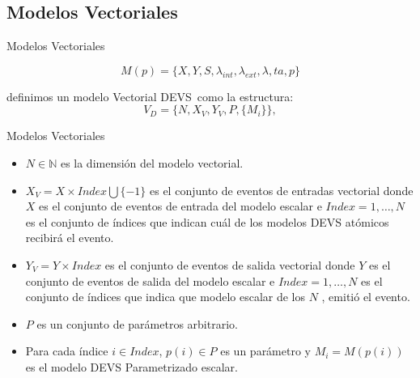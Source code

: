 \documentclass{beamer}
\begin{document}
\subsection{Modelos Vectoriales}
\begin{frame}{Modelos Vectoriales}

	\begin{equation*}
		M (p) = \{X, Y, S, \lambda_{int} , \lambda_{ext} , \lambda, ta, p\}
	\end{equation*}

	definimos un modelo Vectorial DEVS\ como la estructura:
	\begin{equation*}
		V_D = \{N, X_V, Y_V, P, \{M_i\}\},
	\end{equation*}
\end{frame}
\begin{frame}{Modelos Vectoriales}

	\begin{itemize}
		\item<1-> $N \in \mathbb{N}$ es la dimensión del modelo vectorial.

		\item<2-> $X_V = X \times Index \bigcup \{-1\}$ es el conjunto de eventos de entradas vectorial donde $X$ es el conjunto de eventos de entrada del modelo 
		escalar e $Index = {1, \ldots , N }$ es el conjunto de índices que indican cuál de los modelos DEVS atómicos recibirá el evento.

		\item<3-> $Y_V = Y \times Index$ es el conjunto de eventos de salida vectorial donde $Y$ es el conjunto de eventos de salida del modelo escalar e 
		$Index = {1, \ldots , N }$ es el conjunto de índices que indica que modelo escalar de los $N$ , emitió el evento. 

		\item<4-> $P$ es un conjunto de parámetros arbitrario.

		\item<5-> Para cada índice $i \in Index$, $p(i) \in P$ es un parámetro y $M_i = M (p(i))$ es el modelo DEVS Parametrizado escalar.
	\end{itemize}
\end{frame}
\end{document}
